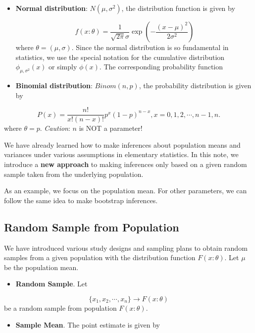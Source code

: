 \documentclass[
]{book}
\providecommand{\tightlist}{%
  \setlength{\itemsep}{0pt}\setlength{\parskip}{0pt}}
\begin{document}
\begin{itemize}
\item
  \textbf{Normal distribution}: \(N(\mu, \sigma^2)\), the distribution function is given by

  \[f(x:\theta) = \frac{1}{\sqrt{2\pi}\sigma}\exp\left(-\frac{(x-\mu)^2}{2\sigma^2}\right)\]
  where \(\theta = (\mu, \sigma)\). Since the normal distribution is so fundamental in statistics, we use the special notation for the cumulative distribution \(\phi_{\mu, \sigma^2}(x)\) or simply \(\phi(x)\). The corresponding probability function
\item
  \textbf{Binomial distribution}: \(Binom(n, p)\), the probability distribution is given by
\end{itemize}

\[ P(x) = \frac{n!}{x!(n-x)!}p^x(1-p)^{n-x}, x = 0, 1, 2, \cdots, n-1, n.\]
where \(\theta = p\). \emph{Caution}: \(n\) is NOT a parameter!

We have already learned how to make inferences about population means and variances under various assumptions in elementary statistics. In this note, we introduce a \textbf{new approach} to making inferences only based on a given random sample taken from the underlying population.

As an example, we focus on the population mean. For other parameters, we can follow the same idea to make bootstrap inferences.

\hypertarget{random-sample-from-population}{%
\subsection{Random Sample from Population}\label{random-sample-from-population}}

We have introduced various study designs and sampling plans to obtain random samples from a given population with the distribution function \(F(x:\theta)\). Let \(\mu\) be the population mean.

\begin{itemize}
\tightlist
\item
  \textbf{Random Sample}. Let
\end{itemize}

\[\{x_1, x_2, \cdots, x_n\} \to F(x:\theta)\]
be a random sample from population \(F(x:\theta)\).

\begin{itemize}
\tightlist
\item
  \textbf{Sample Mean}. The point estimate is given by
\end{itemize}
\end{document}
